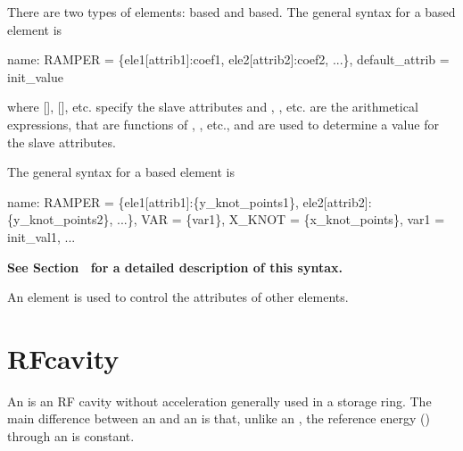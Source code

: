 {There are two types of  elements:  based and  based.
The general syntax for a  based  element is
\begin{example}
  name: RAMPER = \{ele1[attrib1]:coef1, ele2[attrib2]:coef2, ...\}, 
                                                       default_attrib = init_value
\end{example}
where [], [], etc. specify the slave attributes and
, , etc. are the arithmetical expressions, that are functions of ,
, etc., and are used to determine a value for the slave attributes.

The general syntax for a  based   element is
\begin{example}
  name: RAMPER = \{ele1[attrib1]:\{y_knot_points1\}, ele2[attrib2]:\{y_knot_points2\}, ...\}, 
              VAR = \{var1\}, X_KNOT = \{x_knot_points\}, var1 = init_val1, ...
\end{example}

\textbf{See Section~ for a detailed description of this syntax.}

An  element is used to control the attributes of other elements. 

\section{RFcavity}
\label{s:rfcav}

An  is an RF cavity without acceleration generally used
in a storage ring. The main difference between an  and an
 is that, unlike an , the reference energy
() through an  is constant.

}
